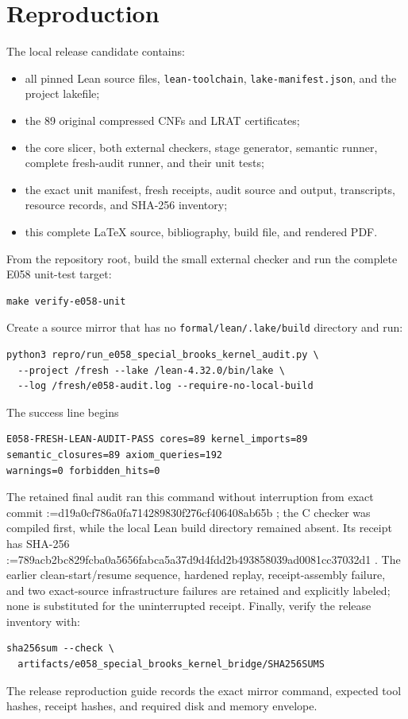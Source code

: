 \documentclass[11pt,reqno,a4paper]{amsart}
\makeatletter
\theoremstyle{definition}
\theoremstyle{remark}
\newcommand{\sha}[1]{%
  \begingroup\ttfamily\small
  \@tfor\@tempa:=#1\do{\@tempa\hspace{0pt}}%
  \endgroup}
\newcommand{\code}[1]{\texttt{#1}}
\makeatother
\begin{document}
\section{Reproduction}\label{sec:reproduction}

The local release candidate contains:
\begin{itemize}[leftmargin=2em]
\item all pinned Lean source files, \code{lean-toolchain},
      \code{lake-manifest.json}, and the project lakefile;
\item the 89 original compressed CNFs and LRAT certificates;
\item the core slicer, both external checkers, stage generator, semantic
      runner, complete fresh-audit runner, and their unit tests;
\item the exact unit manifest, fresh receipts, audit source and output,
      transcripts, resource records, and SHA-256 inventory;
\item this complete \LaTeX{} source, bibliography, build file, and rendered
      PDF.
\end{itemize}

From the repository root, build the small external checker and run the
complete E058 unit-test target:
\begin{verbatim}
make verify-e058-unit
\end{verbatim}
Create a source mirror that has no \code{formal/lean/.lake/build} directory
and run:
\begin{verbatim}
python3 repro/run_e058_special_brooks_kernel_audit.py \
  --project /fresh --lake /lean-4.32.0/bin/lake \
  --log /fresh/e058-audit.log --require-no-local-build
\end{verbatim}
The success line begins
\begin{verbatim}
E058-FRESH-LEAN-AUDIT-PASS cores=89 kernel_imports=89
semantic_closures=89 axiom_queries=192
warnings=0 forbidden_hits=0
\end{verbatim}
The retained final audit ran this command without interruption from exact
commit \sha{d19a0cf786a0fa714289830f276cf406408ab65b}; the C checker was
compiled first, while the local Lean build directory remained absent.  Its
receipt has SHA-256
\sha{789acb2bc829fcba0a5656fabca5a37d9d4fdd2b493858039ad0081cc37032d1}.
The earlier clean-start/resume sequence, hardened replay, receipt-assembly
failure, and two exact-source infrastructure failures are retained and
explicitly labeled; none is substituted for the uninterrupted receipt.
Finally, verify the release inventory with:
\begin{verbatim}
sha256sum --check \
  artifacts/e058_special_brooks_kernel_bridge/SHA256SUMS
\end{verbatim}
The release reproduction guide records the exact mirror command, expected
tool hashes, receipt hashes, and required disk and memory envelope.
\end{document}
